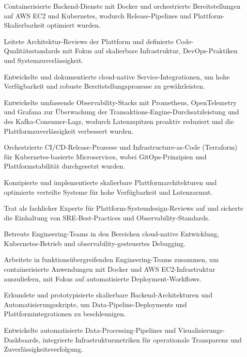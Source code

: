 \documentclass[11pt,a4paper]{resume}
\begin{document}
\bullets
  \item Containerisierte Backend-Dienste mit Docker und orchestrierte Bereitstellungen auf AWS EC2 und Kubernetes, wodurch Release-Pipelines und Plattform-Skalierbarkeit optimiert wurden.
  \item Leitete Architektur-Reviews der Plattform und definierte Code-Qualitätsstandards mit Fokus auf skalierbare Infrastruktur, DevOps-Praktiken und Systemzuverlässigkeit.
  \item Entwickelte und dokumentierte cloud-native Service-Integrationen, um hohe Verfügbarkeit und robuste Bereitstellungsprozesse zu gewährleisten.
\bulletsend
\vspace{3pt}
\bullets
  \item Entwickelte umfassende Observability-Stacks mit Prometheus, OpenTelemetry und Grafana zur Überwachung der Transaktions-Engine-Durchsatzleistung und des Kafka-Consumer-Lags, wodurch Latenzspitzen proaktiv reduziert und die Plattformzuverlässigkeit verbessert wurden.
  \item Orchestrierte CI/CD-Release-Prozesse und Infrastructure-as-Code (Terraform) für Kubernetes-basierte Microservices, wobei GitOps-Prinzipien und Plattformstabilität durchgesetzt wurden.
  \item Konzipierte und implementierte skalierbare Plattformarchitekturen und optimierte verteilte Systeme für hohe Verfügbarkeit und Latenzarmut.
  \item Trat als fachlicher Experte für Plattform-Systemdesign-Reviews auf und sicherte die Einhaltung von SRE-Best-Practices und Observability-Standards.
  \item Betreute Engineering-Teams in den Bereichen cloud-native Entwicklung, Kubernetes-Betrieb und observability-gesteuertes Debugging.
\bulletsend
\vspace{3pt}
\bullets
  \item Arbeitete in funktionsübergreifenden Engineering-Teams zusammen, um containerisierte Anwendungen mit Docker und AWS EC2-Infrastruktur auszuliefern, mit Fokus auf automatisierte Deployment-Workflows.
  \item Erkundete und prototypisierte skalierbare Backend-Architekturen und Automatisierungsskripte, um Data-Pipeline-Deployments und Plattformintegrationen zu beschleunigen.
  \item Entwickelte automatisierte Data-Processing-Pipelines und Visualisierungs-Dashboards, integrierte Infrastrukturmetriken für operationale Transparenz und Zuverlässigkeitsverfolgung.
\bulletsend
\vspace{3pt}
\end{document}

